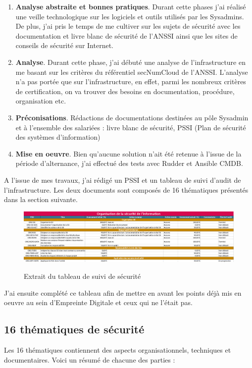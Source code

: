 \documentclass[12pt]{article}
\begin{document}
\begin{enumerate}
    \item \textbf{Analyse abstraite et bonnes pratiques}. Durant cette phases j'ai réalisé une veille technologique sur les logiciels et outils utilisés par les Sysadmins. 
    De plus, j'ai pris le temps de me cultiver sur les sujets de sécurité avec les documentation et livre blanc de sécurité de l'ANSSI ainsi que les sites de conseils de sécurité sur Internet.
    \item \textbf{Analyse}. Durant cette phase, j'ai débuté une analyse de l'infrastructure en me basant sur les critères du référentiel secNumCloud de l'ANSSI. 
    L'analyse n'a pas portée que sur l'infrastructure, en effet, parmi les nombreux critères de certification, on va trouver des besoins en documentation, procédure, organisation etc.
    \item \textbf{Préconisations}. Rédactions de documentations destinées au pôle Sysadmin et à l'ensemble des salariées : livre blanc de sécurité, PSSI (Plan de sécurité des systèmes d'information)
    \item \textbf{Mise en oeuvre}. Bien qu'aucune solution n'ait été retenue à l'issue de la période d'alternance, j'ai effectué des tests avec Rudder et Ansible CMDB.
\end{enumerate}

A l'issue de mes travaux, j'ai rédigé un PSSI et un tableau de suivi d'audit de l'infrastructure. 
Les deux documents sont composés de 16 thématiques présentés dans la section suivante.
\begin{figure}[!ht]
    \centering
    \includegraphics[width=\textwidth]{src/table_example.png}
    \label{fig:pssi_table}
    \caption{Extrait du tableau de suivi de sécurité}
\end{figure}

J'ai ensuite complété ce tableau afin de mettre en avant les points déjà mis en oeuvre au sein d'Empreinte Digitale et ceux qui ne l'était pas.

\newpage
\subsection{16 thématiques de sécurité}
Les 16 thématiques contiennent des aspects organisationnels, techniques et documentaires. 
Voici un résumé de chacune des parties :
\end{document}
